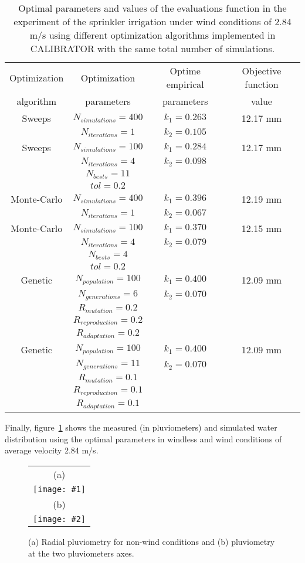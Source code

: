 \documentclass[review,authoryear]{elsarticle}
\newcommand{\TABLE}[5]
{
	\begin{table}[ht!]
		\centering
		\caption{#4.\label{#5}}
		#1
		\begin{tabular}{#2}
			#3
		\end{tabular}
	\end{table}
}
\newcommand{\FIGII}[4]
{
	\begin{figure}[ht!]
		\centering
		\begin{tabular}{c}
			(a) \\ \texttt{[image: \#1]} \\
			(b) \\ \texttt{[image: \#2]}
		\end{tabular}
		\caption{#3.\label{#4}}
	\end{figure}
}
\begin{document}
\TABLE{\scriptsize}{cccc}
{
	Optimization & Optimization & Optime empirical & Objective function
	\\ algorithm & parameters & parameters & value
	\\ \hline
	Sweeps & $N_{simulations}=400$ & $k_1=0.263$ & 12.17 mm
	\\ & $N_{iterations}=1$ & $k_2=0.105$
	\\ \hline
	Sweeps & $N_{simulations}=100$ & $k_1=0.284$ & 12.17 mm
	\\ & $N_{iterations}=4$ & $k_2=0.098$
	\\ & $N_{bests}=11$
	\\ & $tol=0.2$
	\\ \hline
	Monte-Carlo & $N_{simulations}=400$ & $k_1=0.396$ & 12.19 mm
	\\ & $N_{iterations}=1$ & $k_2=0.067$
	\\ \hline
	Monte-Carlo & $N_{simulations}=100$ & $k_1=0.370$ & 12.15 mm
	\\ & $N_{iterations}=4$ & $k_2=0.079$
	\\ & $N_{bests}=4$
	\\ & $tol=0.2$
	\\ \hline
	Genetic & $N_{population}=100$ & $k_1=0.400$ & 12.09 mm
	\\ & $N_{generations}=6$ & $k_2=0.070$
	\\ & $R_{mutation}=0.2$
	\\ & $R_{reproduction}=0.2$
	\\ & $R_{adaptation}=0.2$
	\\ \hline
	Genetic & $N_{population}=100$ & $k_1=0.400$ & 12.09 mm
	\\ & $N_{generations}=11$ & $k_2=0.070$
	\\ & $R_{mutation}=0.1$
	\\ & $R_{reproduction}=0.1$
	\\ & $R_{adaptation}=0.1$
	\\ \hline
}{Optimal parameters and values of the evaluations function in the experiment of the sprinkler irrigation under wind conditions of 2.84 m/s using different optimization algorithms implemented in CALIBRATOR with the same total number of simulations}{TabSprinklerII}

Finally, figure~\ref{FigSprinkler} shows the measured (in pluviometers) and simulated water distribution using the optimal parameters in windless and wind conditions of average velocity 2.84 m/s.

\FIGII{sprinkler-0.eps}{sprinkler-2,84.eps}
{(a) Radial pluviometry for non-wind conditions and (b) pluviometry at the two
pluviometers axes}{FigSprinkler}
\end{document}
